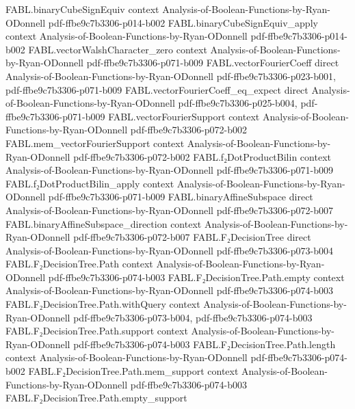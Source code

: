 \begin{theorem}
\proofstep
  {FABL.binaryCubeSignEquiv}
  {context}
  {Analysis-of-Boolean-Functions-by-Ryan-ODonnell}
  {pdf-ffbe9c7b3306-p014-b002}
\proofstep
  {FABL.binaryCubeSignEquiv_apply}
  {context}
  {Analysis-of-Boolean-Functions-by-Ryan-ODonnell}
  {pdf-ffbe9c7b3306-p014-b002}
\proofstep
  {FABL.vectorWalshCharacter_zero}
  {context}
  {Analysis-of-Boolean-Functions-by-Ryan-ODonnell}
  {pdf-ffbe9c7b3306-p071-b009}
\proofstep
  {FABL.vectorFourierCoeff}
  {direct}
  {Analysis-of-Boolean-Functions-by-Ryan-ODonnell}
  {pdf-ffbe9c7b3306-p023-b001,
    pdf-ffbe9c7b3306-p071-b009}
\proofstep
  {FABL.vectorFourierCoeff_eq_expect}
  {direct}
  {Analysis-of-Boolean-Functions-by-Ryan-ODonnell}
  {pdf-ffbe9c7b3306-p025-b004,
    pdf-ffbe9c7b3306-p071-b009}
\proofstep
  {FABL.vectorFourierSupport}
  {context}
  {Analysis-of-Boolean-Functions-by-Ryan-ODonnell}
  {pdf-ffbe9c7b3306-p072-b002}
\proofstep
  {FABL.mem_vectorFourierSupport}
  {context}
  {Analysis-of-Boolean-Functions-by-Ryan-ODonnell}
  {pdf-ffbe9c7b3306-p072-b002}
\proofstep
  {FABL.f₂DotProductBilin}
  {context}
  {Analysis-of-Boolean-Functions-by-Ryan-ODonnell}
  {pdf-ffbe9c7b3306-p071-b009}
\proofstep
  {FABL.f₂DotProductBilin_apply}
  {context}
  {Analysis-of-Boolean-Functions-by-Ryan-ODonnell}
  {pdf-ffbe9c7b3306-p071-b009}
\proofstep
  {FABL.binaryAffineSubspace}
  {direct}
  {Analysis-of-Boolean-Functions-by-Ryan-ODonnell}
  {pdf-ffbe9c7b3306-p072-b007}
\proofstep
  {FABL.binaryAffineSubspace_direction}
  {context}
  {Analysis-of-Boolean-Functions-by-Ryan-ODonnell}
  {pdf-ffbe9c7b3306-p072-b007}
\proofstep
  {FABL.F₂DecisionTree}
  {direct}
  {Analysis-of-Boolean-Functions-by-Ryan-ODonnell}
  {pdf-ffbe9c7b3306-p073-b004}
\proofstep
  {FABL.F₂DecisionTree.Path}
  {context}
  {Analysis-of-Boolean-Functions-by-Ryan-ODonnell}
  {pdf-ffbe9c7b3306-p074-b003}
\proofstep
  {FABL.F₂DecisionTree.Path.empty}
  {context}
  {Analysis-of-Boolean-Functions-by-Ryan-ODonnell}
  {pdf-ffbe9c7b3306-p074-b003}
\proofstep
  {FABL.F₂DecisionTree.Path.withQuery}
  {context}
  {Analysis-of-Boolean-Functions-by-Ryan-ODonnell}
  {pdf-ffbe9c7b3306-p073-b004,
    pdf-ffbe9c7b3306-p074-b003}
\proofstep
  {FABL.F₂DecisionTree.Path.support}
  {context}
  {Analysis-of-Boolean-Functions-by-Ryan-ODonnell}
  {pdf-ffbe9c7b3306-p074-b003}
\proofstep
  {FABL.F₂DecisionTree.Path.length}
  {context}
  {Analysis-of-Boolean-Functions-by-Ryan-ODonnell}
  {pdf-ffbe9c7b3306-p074-b002}
\proofstep
  {FABL.F₂DecisionTree.Path.mem_support}
  {context}
  {Analysis-of-Boolean-Functions-by-Ryan-ODonnell}
  {pdf-ffbe9c7b3306-p074-b003}
\proofstep
  {FABL.F₂DecisionTree.Path.empty_support}

\end{theorem}
